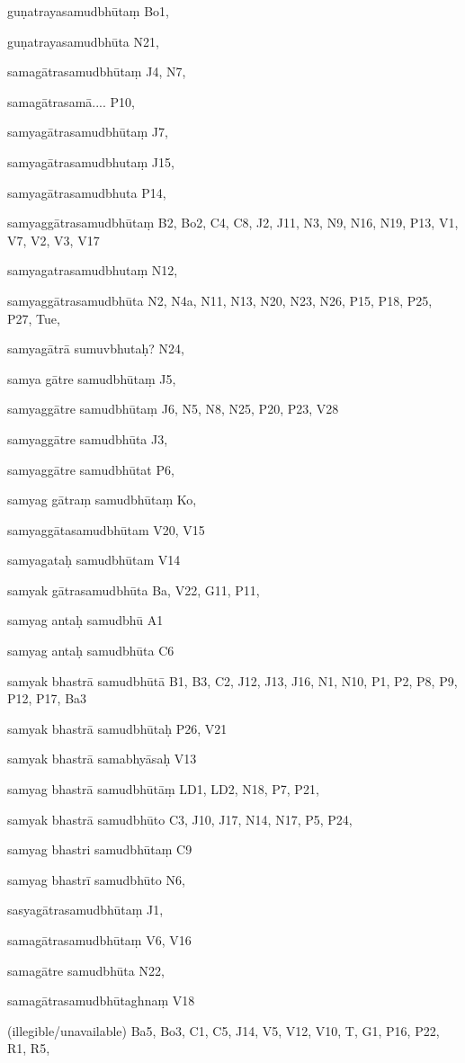 \begin{marma}[hp02_009]
\begin{marma}[hp02_011]
\begin{marma}[hp02_67ab]
\begin{description}
    \end{description}
 \end{marma}

\begin{marma}[hp02_68a]
\item[guṇatrayasamudbhūtaṃ] Bo1,
\item[guṇatrayasamudbhūta] N21,
\item[samagātrasamudbhūtaṃ] J4, N7, 
\item[samagātrasamā....] P10, 
\item[samyagātrasamudbhūtaṃ] J7,
\item[samyagātrasamudbhutaṃ] J15,
\item[samyagātrasamudbhuta] P14,
\item[samyaggātrasamudbhūtaṃ] B2, Bo2, C4, C8, J2, J11, N3, N9, N16, N19, P13, V1, V7, V2, V3, V17
\item[samyagatrasamudbhutaṃ] N12,
\item[samyaggātrasamudbhūta] N2, N4a, N11, N13, N20, N23, N26, P15, P18, P25, P27, Tue, 
\item[samyagātrā sumuvbhutaḥ?] N24,
\item[samya gātre samudbhūtaṃ] J5,
\item[samyaggātre samudbhūtaṃ] J6, N5, N8, N25, P20, P23, V28
\item[samyaggātre samudbhūta] J3,
\item[samyaggātre samudbhūtat] P6, 
\item[samyag gātraṃ samudbhūtaṃ] Ko,
\item[samyaggātasamudbhūtam] V20, V15
\item[samyagataḥ samudbhūtam] V14
\item[samyak gātrasamudbhūta] Ba, V22, G11, P11, 
\item[samyag antaḥ samudbhū] A1
\item[samyag antaḥ samudbhūta] C6
\item[samyak bhastrā samudbhūtā] B1, B3, C2, J12, J13, J16, N1, N10, P1, P2, P8, P9, P12, P17, Ba3
\item[samyak bhastrā samudbhūtaḥ] P26, V21  
\item[samyak bhastrā samabhyāsaḥ] V13
\item[samyag bhastrā samudbhūtāṃ] LD1, LD2, N18, P7, P21, 
\item[samyak bhastrā samudbhūto] C3, J10, J17, N14, N17, P5, P24, 
\item[samyag bhastri samudbhūtaṃ] C9
\item[samyag bhastrī samudbhūto] N6, 
\item[sasyagātrasamudbhūtaṃ] J1,
\item[samagātrasamudbhūtaṃ] V6, V16
\item[samagātre samudbhūta] N22,
\item[samagātrasamudbhūtaghnaṃ] V18
\item[(illegible/unavailable)] Ba5, Bo3, C1, C5, J14, V5, V12, V10, T, G1, P16, P22, R1, R5,
  \begin{description}


\end{description}
\end{marma}
\end{marma}
\end{marma}
